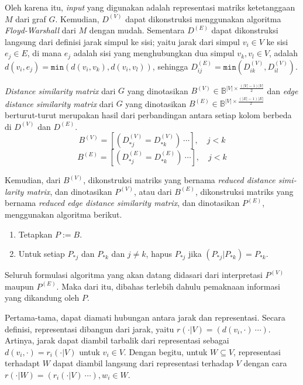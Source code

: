 \documentclass[10pt,twocolumn]{article}
\newcommand{\foreign}[1]{\foreignlanguage{english}{\textit{#1}}}
\def\Bbb{\mathbb{B}}
\def\min{\mathtt{min}}
\begin{document}
Oleh karena itu, \foreign{input} yang digunakan adalah representasi matriks ketetanggaan \(M\) dari graf \(G\). Kemudian, \(D^{(V)}\) dapat dikonstruksi menggunakan algoritma \foreign{Floyd-Warshall} \citep{floyd1962, warshall1962} dari \(M\) dengan mudah. Sementara \(D^{(E)}\) dapat dikonstruksi langsung dari definisi jarak simpul ke sisi; yaitu jarak dari simpul \(v_i \in V\) ke sisi \(e_j \in E\), di mana \(e_j\) adalah sisi yang menghubungkan dua simpul \(v_k, v_l \in V\), adalah \(d(v_i,e_j) = \min(d(v_i, v_k), d(v_i, v_l))\), sehingga \(D^{(E)}_{ij} = \min(D^{(V)}_{ik}, D^{(V)}_{il})\).

\foreign{Distance similarity matrix} dari \(G\) yang dinotasikan \(B^{(V)} \in \Bbb^{|V|\times \frac{(|V|-1)|V|}{2}}\) dan \foreign{edge distance similarity matrix} dari \(G\) yang dinotasikan \(B^{(E)} \in \Bbb^{|V|\times \frac{(|E|-1)|E|}{2}}\) berturut-turut merupakan hasil dari perbandingan antara setiap kolom berbeda di \(D^{(V)}\) dan \(D^{(E)}\).
	\[ B^{(V)} = [(D^{(V)}_{*j} = D^{(V)}_{*k})\ \cdots], \quad j < k\]
	\[ B^{(E)} = [(D^{(E)}_{*j} = D^{(E)}_{*k})\ \cdots], \quad j < k\]

Kemudian, dari \(B^{(V)}\), dikonstruksi matriks yang bernama \foreign{reduced distance similarity matrix}, dan dinotasikan \(P^{(V)}\), atau dari \(B^{(E)}\), dikonstruksi matriks yang bernama \foreign{reduced edge distance similarity matrix}, dan dinotasikan \(P^{(E)}\), menggunakan algoritma berikut.
\begin{enumerate}
	\item Tetapkan \(P := B\).
	\item Untuk setiap \(P_{*j}\) dan \(P_{*k}\) dan \(j \neq k\), hapus \(P_{*j}\) jika \((P_{*j} | P_{*k}) = P_{*k}\).
\end{enumerate}

Seluruh formulasi algoritma yang akan datang didasari dari interpretasi \(P^{(V)}\) maupun \(P^{(E)}\). Maka dari itu, dibahas terlebih dahulu pemaknaan informasi yang dikandung oleh \(P\).

Pertama-tama, dapat diamati hubungan antara jarak dan representasi. Secara definisi, representasi dibangun dari jarak, yaitu \(r(\cdot|V)=(d(v_i,\cdot)\ \cdots)\). Artinya, jarak dapat diambil tarbalik dari representasi sebagai \(d(v_i,\cdot) = r_i(\cdot|V)\) untuk \(v_i \in V\). Dengan begitu, untuk \(W \subseteq V\), representasi terhadapt \(W\) dapat diambil langsung dari representasi terhadap \(V\) dengan cara \(r(\cdot|W) = (r_i(\cdot|V)\ \cdots), w_i \in W\).
\end{document}
